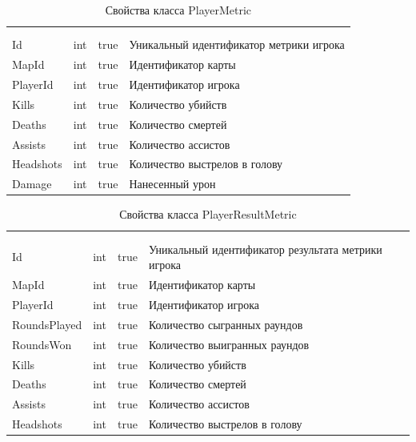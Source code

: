 \begin{xltabular}{\textwidth}{|X|X|X|X|}
	\caption{Свойства класса PlayerMetric}\label{table:PlayerMetric}\\ \hline
	 &  &  &  \\ \hline
	 &  &  &  \\ \hline
	\endfirsthead
	 \hline
	 &  &  &  \\ \hline
	\endhead
	Id & int & true & Уникальный идентификатор метрики игрока \\ \hline
	MapId & int & true & Идентификатор карты \\ \hline
	PlayerId & int & true & Идентификатор игрока \\ \hline
	Kills & int & true & Количество убийств \\ \hline
	Deaths & int & true & Количество смертей \\ \hline
	Assists & int & true & Количество ассистов \\ \hline
	Headshots & int & true & Количество выстрелов в голову \\ \hline
	Damage & int & true & Нанесенный урон \\ \hline
\end{xltabular}

\begin{xltabular}{\textwidth}{|X|X|X|X|}
	\caption{Свойства класса PlayerResultMetric}\label{table:PlayerResultMetric}\\ \hline
	 &  &  &  \\ \hline
	 &  &  &  \\ \hline
	\endfirsthead
	 \hline
	 &  &  &  \\ \hline
	\endhead
	Id & int & true & Уникальный идентификатор результата метрики игрока \\ \hline
	MapId & int & true & Идентификатор карты \\ \hline
	PlayerId & int & true & Идентификатор игрока \\ \hline
	RoundsPlayed & int & true & Количество сыгранных раундов \\ \hline
	RoundsWon & int & true & Количество выигранных раундов \\ \hline
	Kills & int & true & Количество убийств \\ \hline
	Deaths & int & true & Количество смертей \\ \hline
	Assists & int & true & Количество ассистов \\ \hline
	Headshots & int & true & Количество выстрелов в голову \\ \hline
\end{xltabular}

